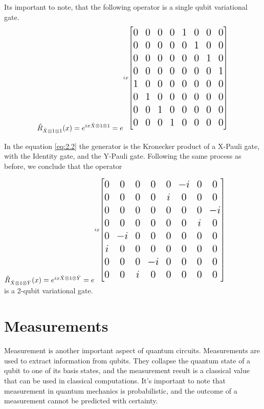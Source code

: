\documentclass[inscr,ack,preface]{diphdthesis}
\begin{document}
Its important to note, that the following operator is a single \acrshort{qubit} variational gate.
\[\Large
\hat{R}_{\hat{X}\otimes 1\otimes1}(x) = e^{i x \hat{X}\otimes 1\otimes1} = e^{i x \begin{bmatrix}
    0 & 0 & 0 & 0 & 1 & 0 & 0 & 0 \\
    0 & 0 & 0 & 0 & 0 & 1 & 0 & 0 \\
    0 & 0 & 0 & 0 & 0 & 0 & 1 & 0 \\
    0 & 0 & 0 & 0 & 0 & 0 & 0 & 1 \\
    1 & 0 & 0 & 0 & 0 & 0 & 0 & 0 \\
    0 & 1 & 0 & 0 & 0 & 0 & 0 & 0 \\
    0 & 0 & 1 & 0 & 0 & 0 & 0 & 0 \\
    0 & 0 & 0 & 1 & 0 & 0 & 0 & 0 \\
\end{bmatrix}}\]
\normalsize  

In the equation {\ref{eq:2.2}} the generator is the Kronecker product of a X-Pauli gate, with the Identity gate, and the Y-Pauli gate. 
Following the same process as before, we conclude that the operator  

$\Large\hat{R}_{\hat{X}\otimes 1\otimes \hat{Y}}(x)=e^{i x \hat{X}\otimes 1\otimes\hat{Y}} = e^{i x \begin{bmatrix} 0 & 0 & 0 & 0 & 0 & -i & 0 & 0 \\ 0 & 0 & 0 & 0 & i & 0 & 0 & 0 \\ 0 & 0 & 0 & 0 & 0 & 0 & 0 & -i \\ 0 & 0 & 0 & 0 & 0 & 0 & i & 0 \\ 0 & -i & 0 & 0 & 0 & 0 & 0 & 0 \\ i & 0 & 0 & 0 & 0 & 0 & 0 & 0 \\ 0 & 0 & 0 & -i & 0 & 0 & 0 & 0 \\ 0 & 0 & i & 0 & 0 & 0 & 0 & 0 \end{bmatrix}}$ \normalsize \\is a 2-\acrshort{qubit} variational gate.

\section{Measurements}

Measurement is another important aspect of quantum circuits. Measurements are used to extract information from \acrshort{qubit}s. They collapse the quantum state of a \acrshort{qubit} to one of its basis states, and the measurement result is a classical value that can be used in classical computations. It's important to note that measurement in quantum mechanics is probabilistic, and the outcome of a measurement cannot be predicted with certainty.
\end{document}
